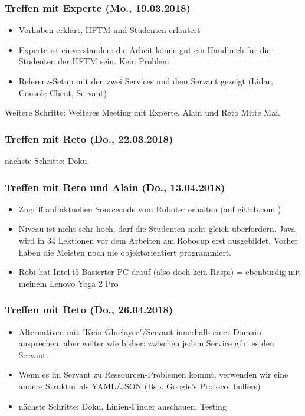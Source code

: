 \subsubsection{Treffen mit Experte (Mo., 19.03.2018)}
\begin{itemize}
	\item Vorhaben erklärt, HFTM und Studenten erläutert
	\item Experte ist einverstanden: die Arbeit könne gut ein Handbuch für die Studenten der HFTM sein. Kein Problem.
	\item Referenz-Setup mit den zwei Services und dem Servant gezeigt (Lidar, Console Client, Servant)
\end{itemize}
Weitere Schritte: Weiteres Meeting mit Experte, Alain und Reto Mitte Mai.
\subsubsection{Treffen mit Reto (Do., 22.03.2018)}
nächste Schritte: Doku

\subsubsection{Treffen mit Reto und Alain (Do., 13.04.2018)}
\begin{itemize}
	\item Zugriff auf aktuellen Sourcecode vom Roboter erhalten (auf gitlab.com \cite{gitlab.com/solidus/hefei})
	\item Niveau ist nicht sehr hoch, darf die Studenten nicht gleich überfordern. Java wird in 34 Lektionen vor dem Arbeiten am Robocup erst ausgebildet. Vorher haben die Meisten noch nie objektorientiert programmiert.
	\item Robi hat Intel i5-Basierter PC drauf (also doch kein Raspi) = ebenbürdig mit meinem Lenovo Yoga 2 Pro
\end{itemize}

\subsubsection{Treffen mit Reto (Do., 26.04.2018)}
\begin{itemize}
	\item Alternativen mit "Kein Gluelayer"/Servant innerhalb einer Domain ansprechen, aber weiter wie bisher: zwischen jedem Service gibt es den Servant.
	\item Wenn es im Servant zu Ressourcen-Problemen kommt, verwenden wir eine andere Struktur als YAML/JSON (Bsp. Google's Protocol buffers)
	\item nächste Schritte: Doku, Linien-Finder anschauen, Testing
\end{itemize}

